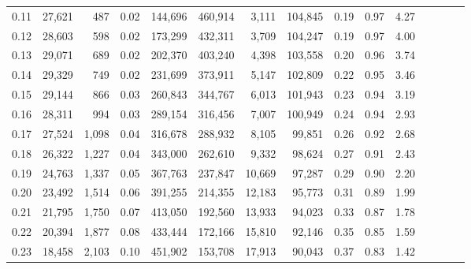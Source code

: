 \begin{tabular}{rrrcrrrrrrrrrrr}
0.11 &  27,621 &    487 &                                       0.02 &  144,696 &  460,914 &    3,111 &  104,845 &  0.19 &  0.97 &                         4.27 \\
0.12 &  28,603 &    598 &                                       0.02 &  173,299 &  432,311 &    3,709 &  104,247 &  0.19 &  0.97 &                         4.00 \\
0.13 &  29,071 &    689 &                                       0.02 &  202,370 &  403,240 &    4,398 &  103,558 &  0.20 &  0.96 &                         3.74 \\
0.14 &  29,329 &    749 &                                       0.02 &  231,699 &  373,911 &    5,147 &  102,809 &  0.22 &  0.95 &                         3.46 \\
0.15 &  29,144 &    866 &                                       0.03 &  260,843 &  344,767 &    6,013 &  101,943 &  0.23 &  0.94 &                         3.19 \\
0.16 &  28,311 &    994 &                                       0.03 &  289,154 &  316,456 &    7,007 &  100,949 &  0.24 &  0.94 &                         2.93 \\
0.17 &  27,524 &  1,098 &                                       0.04 &  316,678 &  288,932 &    8,105 &   99,851 &  0.26 &  0.92 &                         2.68 \\
0.18 &  26,322 &  1,227 &                                       0.04 &  343,000 &  262,610 &    9,332 &   98,624 &  0.27 &  0.91 &                         2.43 \\
0.19 &  24,763 &  1,337 &                                       0.05 &  367,763 &  237,847 &   10,669 &   97,287 &  0.29 &  0.90 &                         2.20 \\
0.20 &  23,492 &  1,514 &                                       0.06 &  391,255 &  214,355 &   12,183 &   95,773 &  0.31 &  0.89 &                         1.99 \\
0.21 &  21,795 &  1,750 &                                       0.07 &  413,050 &  192,560 &   13,933 &   94,023 &  0.33 &  0.87 &                         1.78 \\
0.22 &  20,394 &  1,877 &                                       0.08 &  433,444 &  172,166 &   15,810 &   92,146 &  0.35 &  0.85 &                         1.59 \\
0.23 &  18,458 &  2,103 &                                       0.10 &  451,902 &  153,708 &   17,913 &   90,043 &  0.37 &  0.83 &                         1.42 \\

\end{tabular}
